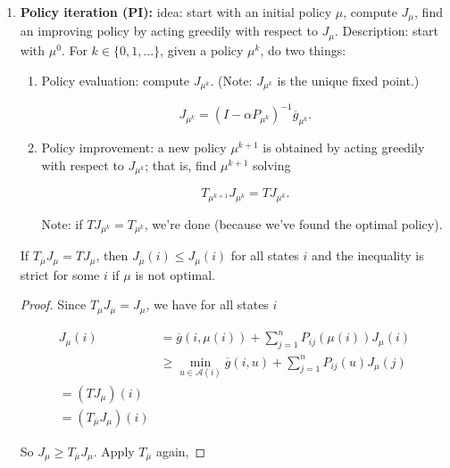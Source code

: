\begin{enumerate}
\begin{proof}
\end{proof}

\item \textbf{Policy iteration (PI):} idea: start with an initial policy \(\mu\), compute \(J_\mu\), find an improving policy by acting greedily with respect to \(J_\mu\). Description: start with \(\mu^0\). For \(k \in \{0, 1, \ldots\}\), given a policy \(\mu^k\), do two things:

\begin{enumerate}

\item Policy evaluation: compute \(J_{\mu^k}\). (Note: \(J_{\mu^k}\) is the unique fixed point.) 

\[
J_{\mu^k} = (I - \alpha P_{\mu^k})^{-1} \overline{g}_{\mu^k}.
\]

\item Policy improvement: a new policy \(\mu^{k+1}\) is obtained by acting greedily with respect to \(J_{\mu^k}\); that is, find \(\mu^{k+1}\) solving

\[
T_{\mu^{k+1}} J_{\mu^k} = T J_{\mu^k}.
\]

Note: if \(T J_{\mu^k} = T_{\mu^k}\), we're done (because we've found the optimal policy).

\end{enumerate}

\begin{theorem}

If \(T_{\overline{\mu}} J_\mu = T J_\mu\), then \(J_{\overline{\mu}}(i) \leq J_\mu(i)\) for all states \(i\) and the inequality is strict for some \(i\) if \(\mu\) is not optimal. 

\end{theorem}

\begin{proof}

Since \(T_\mu J_\mu = J_\mu\), we have for all states \(i\)

\begin{align*}
J_\mu(i) & = \overline{g}(i, \mu(i)) + \sum_{j=1}^n P_{ij}(\mu(i)) J_\mu(i) 
\\ & \geq \min_{u \in \mathcal{A}(i)} \overline{g}(i, u) + \sum_{j=1}^n P_{ij}(u) J_\mu(j)
\\ = (T J_\mu)(i)
\\ = (T_{\overline{\mu}} J_\mu)(i) 
\end{align*}

So \(J_\mu \geq T_{\overline{\mu}} J_\mu\). Apply \(T_{\overline{\mu}}\) again,


\end{proof}
\end{enumerate}
